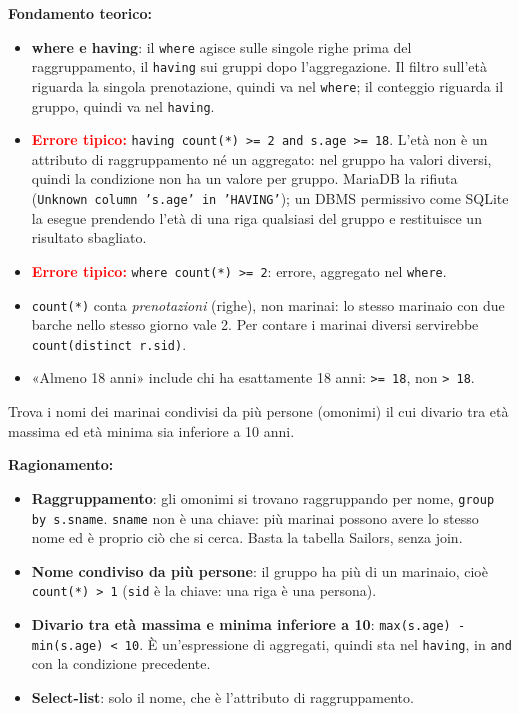 \documentclass[12pt, a4paper]{article}
\begin{document}
\textbf{Fondamento teorico:}
\begin{itemize}
\item \textbf{where e having}: il \texttt{where} agisce sulle singole righe prima del raggruppamento, il \texttt{having} sui gruppi dopo l'aggregazione. Il filtro sull'età riguarda la singola prenotazione, quindi va nel \texttt{where}; il conteggio riguarda il gruppo, quindi va nel \texttt{having}.
\item \textcolor{red}{\textbf{Errore tipico:}} \texttt{having count(*) >= 2 and s.age >= 18}. L'età non è un attributo di raggruppamento né un aggregato: nel gruppo ha valori diversi, quindi la condizione non ha un valore per gruppo. MariaDB la rifiuta (\texttt{Unknown column 's.age' in 'HAVING'}); un DBMS permissivo come SQLite la esegue prendendo l'età di una riga qualsiasi del gruppo e restituisce un risultato sbagliato.
\item \textcolor{red}{\textbf{Errore tipico:}} \texttt{where count(*) >= 2}: errore, aggregato nel \texttt{where}.
\item \texttt{count(*)} conta \emph{prenotazioni} (righe), non marinai: lo stesso marinaio con due barche nello stesso giorno vale 2. Per contare i marinai diversi servirebbe \texttt{count(distinct r.sid)}.
\item «Almeno 18 anni» include chi ha esattamente 18 anni: \texttt{>= 18}, non \texttt{> 18}.
\end{itemize}

\begin{tcolorbox}[colback=lightergray!10, colframe=tocsec, title=\textbf{Esercizio SQL 3}]
Trova i nomi dei marinai condivisi da più persone (omonimi) il cui divario tra età massima ed età minima sia inferiore a 10 anni.
\end{tcolorbox}

\textbf{Ragionamento:}
\begin{itemize}
\item \textbf{Raggruppamento}: gli omonimi si trovano raggruppando per nome, \texttt{group by s.sname}. \texttt{sname} non è una chiave: più marinai possono avere lo stesso nome ed è proprio ciò che si cerca. Basta la tabella Sailors, senza join.
\item \textbf{Nome condiviso da più persone}: il gruppo ha più di un marinaio, cioè \texttt{count(*) > 1} (\texttt{sid} è la chiave: una riga è una persona).
\item \textbf{Divario tra età massima e minima inferiore a 10}: \texttt{max(s.age) - min(s.age) < 10}. È un'espressione di aggregati, quindi sta nel \texttt{having}, in \texttt{and} con la condizione precedente.
\item \textbf{Select-list}: solo il nome, che è l'attributo di raggruppamento.
\end{itemize}
\end{document}
